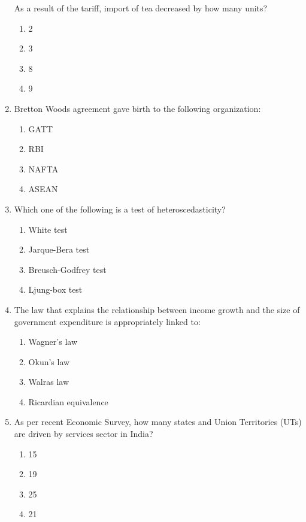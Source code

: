 \documentclass[journal,12pt,onecolumn]{exam}
\theoremstyle{remark}
\begin{document}
\begin{enumerate}
  As a result of the tariff, import of tea decreased by how many units?

  \begin{enumerate}
    \item 2
    \item 3
    \item 8
    \item 9
  \end{enumerate}
\newpage
\item Bretton Woods agreement gave birth to the following organization: 
\begin{enumerate}
    \item GATT
    \item RBI
    \item NAFTA
    \item ASEAN
\end{enumerate}
\item Which one of the following is a test of heteroscedasticity?
  \begin{enumerate}
    \item White test
    \item Jarque-Bera test
    \item Breusch-Godfrey test
    \item Ljung-box test
  \end{enumerate}

  \item The law that explains the relationship between income growth and the size of government expenditure is appropriately linked to:
  \begin{enumerate}
    \item Wagner's law
    \item Okun's law
    \item Walras law
    \item Ricardian equivalence
  \end{enumerate}

  \item As per recent Economic Survey, how many states and Union Territories (UTs) are driven by services sector in India?
  \begin{enumerate}
    \item 15
    \item 19
    \item 25
    \item 21
  \end{enumerate}


\end{enumerate}
\end{document}
